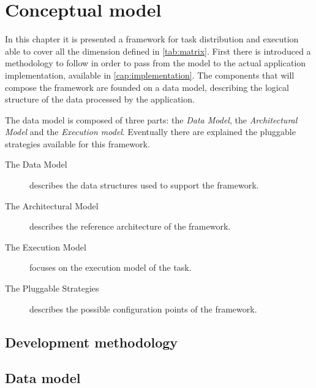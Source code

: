 \chapter{Conceptual model}
\label{cap:model}



In this chapter it is presented a framework for task distribution and execution
able to cover all the dimension defined in \autoref{tab:matrix}.
First there is introduced a methodology to follow in order to pass from the model to the
actual application implementation, available in \autoref{cap:implementation}.
The components that will compose the framework are founded on a data model,
describing the logical structure of the data processed by the application.

The data model is composed of three parts: the \emph{Data Model}, the
\emph{Architectural Model} and the \emph{Execution model}. Eventually there are
explained the pluggable strategies available for this framework.
\begin{description}
    \item[The Data Model] describes the data structures
    used to support the framework.
    \item[The Architectural Model] describes
    the reference architecture of the framework.
    \item[The Execution Model] focuses on the
    execution model of the task.
    \item[The Pluggable Strategies] describes
    the possible configuration points of the framework.
\end{description}

\section{Development methodology}
\label{sec:model:method}


\section{Data model}
\label{sec:model:data}


